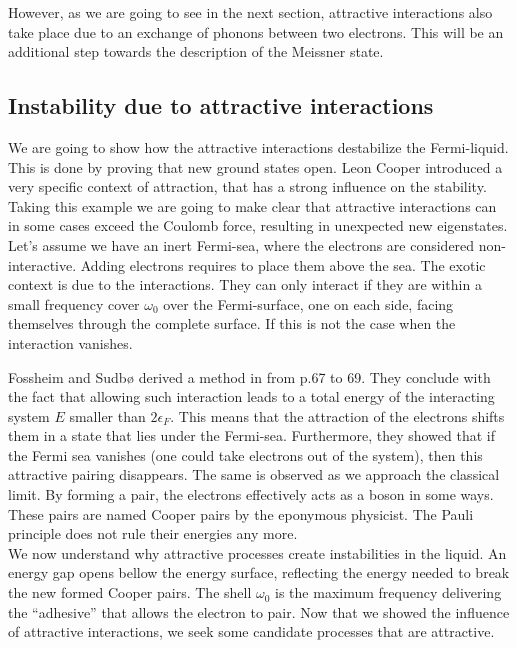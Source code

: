 \documentclass[../main.tex]{subfile}
\begin{document}
However, as we are going to see in the next section, attractive interactions also take place due to an exchange of phonons between two electrons. This will be 
an additional step towards the description of the Meissner state.

\subsection{Instability due to attractive interactions}
We are going to show how the attractive interactions destabilize the Fermi-liquid. This is done by proving
that new ground states open. Leon Cooper introduced a very specific context of attraction, that has a strong influence on the stability. Taking this example we are going
to make clear that attractive interactions can in some cases exceed the Coulomb force, resulting in unexpected new eigenstates.\\

Let's assume we have an inert Fermi-sea, where the electrons are considered non-interactive. Adding electrons requires to place them
above the sea. The exotic context is due to the interactions. They can only interact if they are within a small frequency cover $\omega_0$
over the Fermi-surface, one on each side, facing themselves through the complete surface. If this is not the case when the interaction vanishes.

Fossheim and Sudbø derived a method in \cite{FossheimSudbo2004} from p.67 to 69. They conclude with the fact that allowing such
interaction leads to a total energy of the interacting system $E$ smaller than $2 \epsilon_{F}$. This means that the attraction of the electrons
shifts them in a state that lies under the Fermi-sea. Furthermore, they showed that if the Fermi sea vanishes (one could take electrons out of the system), 
then this attractive pairing disappears. The same is observed as we approach the classical limit.
By forming a pair, the electrons effectively acts as a boson in some ways. These pairs are named Cooper pairs by the eponymous physicist.
The Pauli principle does not rule their energies any more.\\

We now understand why attractive processes create instabilities in the liquid. An energy gap opens bellow the energy surface,
reflecting the energy needed to break the new formed Cooper pairs. The shell $\omega_0$ is the maximum frequency delivering
the ``adhesive'' that allows the electron to pair.
Now that we showed the influence of attractive interactions, we seek some candidate processes that are attractive.
\end{document}
